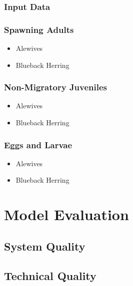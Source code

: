 \documentclass[
]{book}
\providecommand{\tightlist}{%
  \setlength{\itemsep}{0pt}\setlength{\parskip}{0pt}}
\begin{document}
\hypertarget{input-data}{%
\subsection{Input Data}\label{input-data}}

\hypertarget{spawning-adults-2}{%
\subsection{Spawning Adults}\label{spawning-adults-2}}

\begin{itemize}
\tightlist
\item
  Alewives
\item
  Blueback Herring
\end{itemize}

\hypertarget{non-migratory-juveniles-3}{%
\subsection{Non-Migratory Juveniles}\label{non-migratory-juveniles-3}}

\begin{itemize}
\tightlist
\item
  Alewives
\item
  Blueback Herring
\end{itemize}

\hypertarget{eggs-and-larvae-1}{%
\subsection{Eggs and Larvae}\label{eggs-and-larvae-1}}

\begin{itemize}
\tightlist
\item
  Alewives
\item
  Blueback Herring
\end{itemize}

\hypertarget{model-evaluation}{%
\chapter{Model Evaluation}\label{model-evaluation}}

\hypertarget{system-quality}{%
\section{System Quality}\label{system-quality}}

\hypertarget{technical-quality}{%
\section{Technical Quality}\label{technical-quality}}
\end{document}
